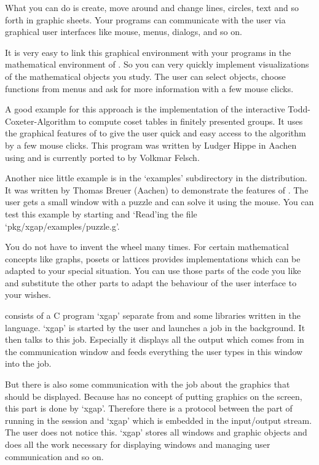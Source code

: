 What you can do is create, move around and change lines, circles, text and
so forth in graphic sheets. Your programs can communicate with the user via
graphical user interfaces like mouse, menus, dialogs, and so on.

It is very easy to link this graphical environment with your programs in
the mathematical environment of {\GAP}. So you can very quickly implement
visualizations of the mathematical objects you study. The user can select
objects, choose functions from menus and ask for more information with a
few mouse clicks. 

A good example for this approach is the implementation of the interactive
Todd-Coxeter-Algorithm to compute coset tables in finitely presented
groups. It uses the graphical features of {\XGAP} to give the user quick
and easy access to the algorithm by a few mouse clicks. This program was
written by Ludger Hippe in Aachen using {} and is currently ported to
{} by Volkmar Felsch.

Another nice little example is in the `examples' subdirectory in the
{\XGAP} distribution. It was written by Thomas Breuer (Aachen) to
demonstrate the features of {\XGAP}. The user gets a small window with a
puzzle and can solve it using the mouse. You can test this example by
starting {\XGAP} and `Read'ing the file `pkg/xgap/examples/puzzle.g'.

You do not have to invent the wheel many times. For certain mathematical
concepts like graphs, posets or lattices {\XGAP} provides implementations
which can  
be adapted to your special situation. You can use those parts of the code
you like and substitute the other parts to adapt the behaviour of the user
interface to your wishes.



{\XGAP} consists of a C program `xgap' separate from {\GAP} and some
libraries written in the {\GAP} language. `xgap' is started by the
user and launches a {\GAP} job in the background. It then talks 
to this {\GAP} job. Especially it displays all the output which comes from
{\GAP} in the communication window and feeds everything the user types in
this window into the {\GAP} job. 

But there is also some communication with the {\GAP} job about the graphics
that should be displayed. Because {\GAP} has no concept of putting graphics
on the screen, this part is done by `xgap'. Therefore there is a protocol
between the {\GAP} part of {\XGAP} running in the {\GAP} session and `xgap' 
which is embedded in the input/output stream. The user does not notice
this. `xgap' stores all windows and graphic objects and does all the work
necessary for displaying windows and managing user communication and so on.

